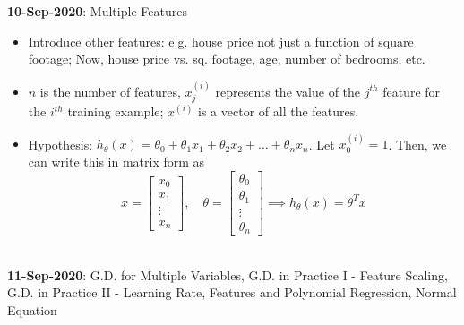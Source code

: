 \documentclass[10pt]{article}
\begin{document}
{\large \textbf{10-Sep-2020}: Multiple Features}
\begin{itemize}
  \item Introduce other features: e.g. house price not just a function of square footage; Now, house price vs. sq. footage, age, number of bedrooms, etc.
  \item $n$ is the number of features, $x_j^{(i)}$ represents the value of the $j^{th}$ feature for the $i^{th}$ training example; $x^{(i)}$ is a vector of all the features.
  \item Hypothesis: $h_{\theta}(x) = \theta_0 + \theta_1x_1 + \theta_2 x_2 + \dots + \theta_n x_n$. Let $x_0^{(i)}=1$. Then, we can write this in matrix form as
    \begin{equation*}
      x=\begin{bmatrix}x_0 \\ x_1 \\ \vdots \\ x_n\end{bmatrix}, \quad \theta = \begin{bmatrix} \theta_0 \\ \theta_1 \\ \vdots \\ \theta_n \end{bmatrix} \implies h_{\theta}(x) = \theta^T x
    \end{equation*}
\end{itemize}
\hfill \\
{\large \textbf{11-Sep-2020}: G.D. for Multiple Variables, G.D. in Practice I - Feature Scaling, G.D. in Practice II - Learning Rate, Features and Polynomial Regression, Normal Equation}
\end{document}
